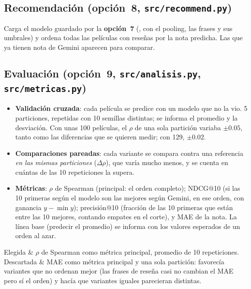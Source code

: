 \documentclass[11pt,a4paper]{article}
\makeatletter
\newcommand{\menu}[1]{\textsf{\textbf{opción~#1}}}
\newenvironment{decision}[1]{\par\smallskip\noindent\tabularx{\linewidth}{@{}>{\bfseries\raggedright}p{2.9cm} >{\raggedright\arraybackslash}X@{}}\toprule}{\bottomrule\endtabularx\par\medskip}
\makeatother
\begin{document}
\subsection{Recomendación (\menu{8}, \texttt{src/recommend.py})}

Carga el modelo guardado por la \menu{7} (, con el pooling, las
frases y sus umbrales) y ordena todas las películas con reseñas por la nota predicha. Las que ya tienen nota de Gemini
aparecen para comparar.

\subsection{Evaluación (\menu{9}, \texttt{src/analisis.py}, \texttt{src/metricas.py})}\label{sec:evaluacion}

\begin{itemize}
  \item \textbf{Validación cruzada}: cada película se predice con un modelo que no la vio. 5 particiones, repetidas con
  10 semillas distintas; se informa el promedio y la desviación. Con unas 100 películas, el $\rho$ de una sola partición
  variaba $\pm 0.05$, tanto como las diferencias que se quieren medir; con 129, $\pm 0.02$.
  \item \textbf{Comparaciones pareadas}: cada variante se compara contra una referencia \emph{en las mismas
  particiones} ($\Delta\rho$), que varía mucho menos, y se cuenta en cuántas de las 10 repeticiones la supera.
  \item \textbf{Métricas}: $\rho$ de Spearman (principal: el orden completo); NDCG@10 (si las 10 primeras según el
  modelo son las mejores según Gemini, en ese orden, con ganancia $y-\min y$); precisión@10 (fracción de las 10
  primeras que están entre las 10 mejores, contando empates en el corte), y MAE de la nota. La línea base (predecir el
  promedio) se informa con los valores esperados de un orden al azar.
\end{itemize}

\begin{decision}{}
Elegida & $\rho$ de Spearman como métrica principal, promedio de 10 repeticiones. \\
Descartada & MAE como métrica principal y una sola partición: favorecía variantes que no ordenan mejor (las frases de
reseña casi no cambian el MAE pero sí el orden) y hacía que variantes iguales parecieran distintas. \\
\end{decision}
\end{document}

